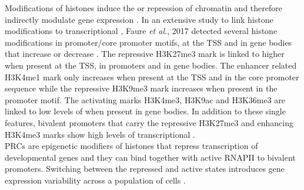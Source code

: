 Modifications of histones induce the  or repression of chromatin and  therefore indirectly modulate gene expression \citep{Suganuma2011}. 
In an extensive study to link histone modifications to transcriptional , Faure \textit{et al.}, 2017 detected several histone modifications in promoter/core promoter motifs, at the TSS and in gene bodies that increase or decrease . 
The repressive \gls{H3K27me3} mark is linked to higher  when present at the TSS, in promoters and in gene bodies. 
The enhancer related \gls{H3K4me1} mark only increases  when present at the TSS and in the core promoter sequence while the repressive \gls{H3K9me3} mark increases  when present in the promoter motif. 
The activating marks \gls{H3K4me3}, \gls{H3K9ac} and \gls{H3K36me3} are linked to low levels of  when present in gene bodies. 
In addition to these single features, bivalent promoters that carry the repressive \gls{H3K27me3} and enhancing \gls{H3K4me3} marks show high levels of transcriptional  \citep{Faure2017}.
\\ 

PRCs are epigenetic modifiers of histones that repress transcription of developmental genes \citep{Chittock2017} and they can bind together with active \gls{RNAPII} to bivalent promoters. 
Switching between the repressed and active states introduces gene expression variability across a population of cells \cite{Kar2017}.

